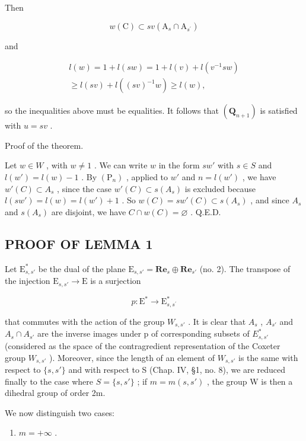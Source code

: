 Then

\[
w (\mathrm{C}) \subset s v \left(\mathrm{A} _ {s} \cap \mathrm{A} _ {s ^ {\prime}}\right)
\]

and

\[
\begin{array}{c} l (w) = 1 + l (s w) = 1 + l (v) + l (v ^ {- 1} s w) \\ \geqslant l (s v) + l ((s v) ^ {- 1} w) \geqslant l (w), \end{array}
\]

so the inequalities above must be equalities. It follows that \((\mathbf{Q}_{n + 1})\) is satisfied with \(u = sv\) .

Proof of the theorem.

Let \(w \in W\) , with \(w \neq 1\) . We can write \(w\) in the form \(sw'\) with \(s \in S\) and \(l(w') = l(w) - 1\) . By \((\mathrm{P}_n)\) , applied to \(w'\) and \(n = l(w')\) , we have \(w'(C) \subset A_s\) , since the case \(w'(C) \subset s(A_s)\) is excluded because \(l(sw') = l(w) = l(w') + 1\) . So \(w(C) = sw'(C) \subset s(A_s)\) , and since \(A_s\) and \(s(A_s)\) are disjoint, we have \(C \cap w(C) = \varnothing\) . Q.E.D.

\subsection{PROOF OF LEMMA 1}

Let \(\mathrm{E}_{s,s'}^*\) be the dual of the plane \(\mathrm{E}_{s,s'} = \mathbf{Re}_s\oplus \mathbf{Re}_{s'}\) (no. 2). The transpose of the injection \(\mathrm{E}_{s,s'}\to \mathrm{E}\) is a surjection

\[
p: \mathrm{E} ^ {*} \to \mathrm{E} _ {s, s ^ {\prime}} ^ {*}
\]

that commutes with the action of the group \(W_{s,s'}\) . It is clear that \(A_{s}\) , \(A_{s'}\) and \(A_{s} \cap A_{s'}\) are the inverse images under p of corresponding subsets of \(E_{s,s'}^{*}\) (considered as the space of the contragredient representation of the Coxeter group \(W_{s,s'}\) ). Moreover, since the length of an element of \(W_{s,s'}\) is the same with respect to \(\{s,s'\}\) and with respect to S (Chap. IV, §1, no. 8), we are reduced finally to the case where \(S = \{s,s'\}\) ; if \(m = m(s,s')\) , the group W is then a dihedral group of order 2m.

We now distinguish two cases:

\begin{enumerate}
\def\labelenumi{\alph{enumi})}
\tightlist
\item
  \(m = +\infty\) .
\end{enumerate}

